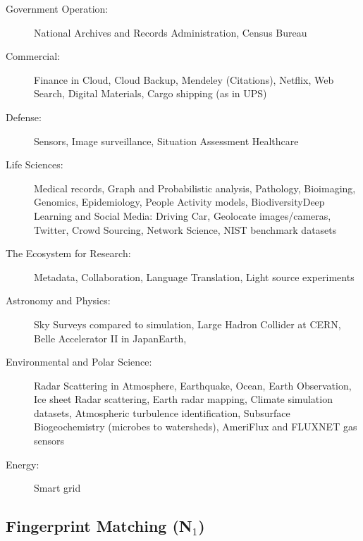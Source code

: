 \begin{description}

\item[Government Operation:] National Archives and Records
  Administration, Census Bureau

\item[Commercial:] Finance in Cloud, Cloud Backup, Mendeley
  (Citations), Netflix, Web Search, Digital Materials, Cargo shipping
  (as in UPS)

\item[Defense:] Sensors, Image surveillance, Situation Assessment
  Healthcare

\item[Life Sciences:] Medical records, Graph and Probabilistic
  analysis, Pathology, Bioimaging, Genomics, Epidemiology, People
  Activity models, BiodiversityDeep Learning and Social Media: Driving
  Car, Geolocate images/cameras, Twitter, Crowd Sourcing, Network
  Science, NIST benchmark datasets

\item[The Ecosystem for Research:] Metadata, Collaboration, Language
  Translation, Light source experiments

\item[Astronomy and Physics:] Sky Surveys compared to simulation,
  Large Hadron Collider at CERN, Belle Accelerator II in JapanEarth,

\item[Environmental and Polar Science:] Radar Scattering in
  Atmosphere, Earthquake, Ocean, Earth Observation, Ice sheet Radar
  scattering, Earth radar mapping, Climate simulation datasets,
  Atmospheric turbulence identification, Subsurface Biogeochemistry
  (microbes to watersheds), AmeriFlux and FLUXNET gas sensors

\item[Energy:] Smart grid

\end{description}






\subsection{Fingerprint Matching (N$_1$)}

